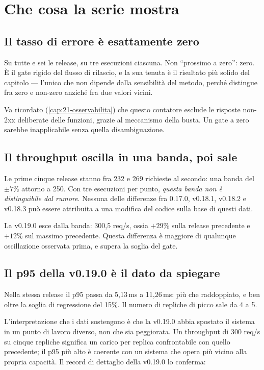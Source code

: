 \section{Che cosa la serie mostra}

\subsection{Il tasso di errore \`e esattamente zero}

Su tutte e sei le release, su tre esecuzioni ciascuna. Non ``prossimo a zero'':
zero. \`E il gate rigido del flusso di rilascio, e la sua tenuta \`e il
risultato pi\`u solido del capitolo --- l'unico che non dipende dalla
sensibilit\`a del metodo, perch\'e distingue fra zero e non-zero anzich\'e fra
due valori vicini.

Va ricordato (\cref{cap:21-osservabilita}) che questo contatore esclude le
risposte non-2xx deliberate delle funzioni, grazie al meccanismo della busta.
Un gate a zero sarebbe inapplicabile senza quella disambiguazione.

\subsection{Il throughput oscilla in una banda, poi sale}

Le prime cinque release stanno fra 232 e 269 richieste al secondo: una banda del
$\pm 7\%$ attorno a 250. Con tre esecuzioni per punto, \emph{questa banda non
\`e distinguibile dal rumore}. Nessuna delle differenze fra 0.17.0, v0.18.1,
v0.18.2 e v0.18.3 pu\`o essere attribuita a una modifica del codice sulla base
di questi dati.

La v0.19.0 esce dalla banda: 300{,}5 req/s, ossia $+29\%$ sulla release
precedente e $+12\%$ sul massimo precedente. Questa differenza \`e maggiore di
qualunque oscillazione osservata prima, e supera la soglia del gate.

\subsection{Il p95 della v0.19.0 \`e il dato da spiegare}

Nella stessa release il p95 passa da 5{,}13\,ms a 11{,}26\,ms: pi\`u che
raddoppiato, e ben oltre la soglia di regressione del 15\%. Il numero di
repliche di picco sale da 4 a 5.

L'interpretazione che i dati sostengono \`e che la v0.19.0 abbia spostato il
sistema in un punto di lavoro diverso, non che sia peggiorata. Un throughput di
300 req/s su cinque repliche significa un carico per replica confrontabile con
quello precedente; il p95 pi\`u alto \`e coerente con un sistema che opera pi\`u
vicino alla propria capacit\`a. Il record di dettaglio della v0.19.0 lo conferma:

